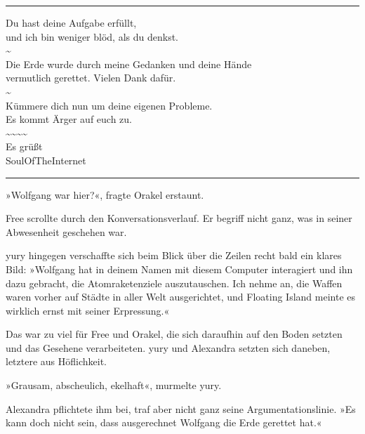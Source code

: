 \noindent \parbox{\textwidth}{ \vspace{3ex} \hrule \vspace{3ex}

    \begin{footnotesize}
    \begin{ttfamily}

\noindent Du hast deine Aufgabe erfüllt,\\
\noindent und ich bin weniger blöd, als du denkst.\\
\noindent \textasciitilde{}\\
\noindent Die Erde wurde durch meine Gedanken und deine Hände\\
\noindent vermutlich gerettet. Vielen Dank dafür.\\
\noindent \textasciitilde{}\\
\noindent Kümmere dich nun um deine eigenen Probleme.\\
\noindent Es kommt Ärger auf euch zu.\\
\noindent \textasciitilde{}\textasciitilde{}\textasciitilde{}\textasciitilde{}\\
\noindent Es grüßt\\
\noindent SoulOfTheInternet

    \end{ttfamily}
    \end{footnotesize}

\vspace{3ex} \hrule \vspace{3ex} }

»Wolfgang war hier?«, fragte Orakel erstaunt.

Free scrollte durch den Konversationsverlauf. Er begriff nicht ganz, was in seiner Abwesenheit geschehen war.

yury hingegen verschaffte sich beim Blick über die Zeilen recht bald ein klares Bild: »Wolfgang hat in deinem Namen mit diesem Computer interagiert und ihn dazu gebracht, die Atomraketenziele auszutauschen. Ich nehme an, die Waffen waren vorher auf Städte in aller Welt ausgerichtet, und Floating Island meinte es wirklich ernst mit seiner Erpressung.«

Das war zu viel für Free und Orakel, die sich daraufhin auf den Boden setzten und das Gesehene verarbeiteten. yury und Alexandra setzten sich daneben, letztere aus Höflichkeit.

»Grausam, abscheulich, ekelhaft«, murmelte yury.

Alexandra pflichtete ihm bei, traf aber nicht ganz seine Argumentationslinie. »Es kann doch nicht sein, dass ausgerechnet Wolfgang die Erde gerettet hat.«

